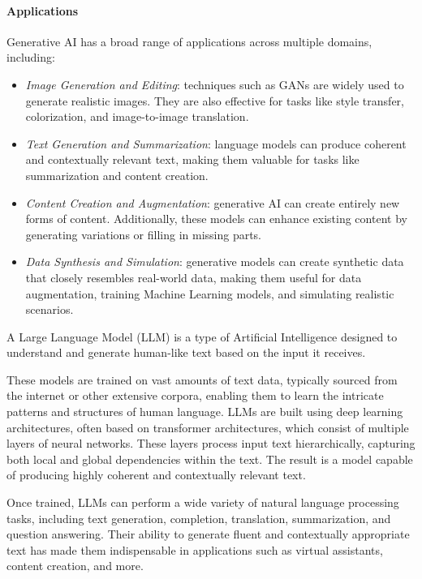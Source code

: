 \paragraph*{Applications}
Generative AI has a broad range of applications across multiple domains, including:
\begin{itemize}
    \item \textit{Image Generation and Editing}: techniques such as GANs are widely used to generate realistic images. 
        They are also effective for tasks like style transfer, colorization, and image-to-image translation.
    \item \textit{Text Generation and Summarization}: language models can produce coherent and contextually relevant text, making them valuable for tasks like summarization and content creation.
    \item \textit{Content Creation and Augmentation}: generative AI can create entirely new forms of content. 
        Additionally, these models can enhance existing content by generating variations or filling in missing parts.
    \item \textit{Data Synthesis and Simulation}: generative models can create synthetic data that closely resembles real-world data, making them useful for data augmentation, training Machine Learning models, and simulating realistic scenarios. 
\end{itemize}

\begin{definition}
    A Large Language Model (LLM) is a type of Artificial Intelligence designed to understand and generate human-like text based on the input it receives.
\end{definition}
\noindent These models are trained on vast amounts of text data, typically sourced from the internet or other extensive corpora, enabling them to learn the intricate patterns and structures of human language. 
LLMs are built using deep learning architectures, often based on transformer architectures, which consist of multiple layers of neural networks. 
These layers process input text hierarchically, capturing both local and global dependencies within the text. The result is a model capable of producing highly coherent and contextually relevant text.

Once trained, LLMs can perform a wide variety of natural language processing tasks, including text generation, completion, translation, summarization, and question answering.
Their ability to generate fluent and contextually appropriate text has made them indispensable in applications such as virtual assistants, content creation, and more.


